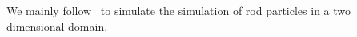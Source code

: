 We mainly follow~\cite{SED} to simulate the simulation of rod particles in a two dimensional domain.
\cite{BD}



